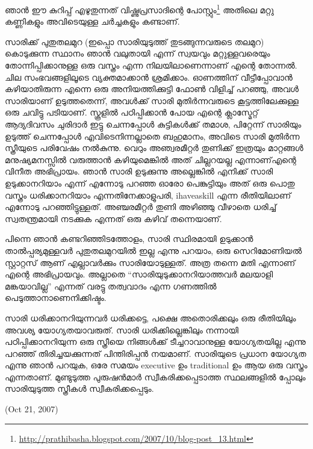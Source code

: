 \vskip 2pt


ഞാന്‍ ഈ കുറിപ്പ് എഴുതുന്നത് വിഷ്ണുപ്രസാദിന്റെ പോസ്റ്റും\footnote{\url{http://prathibasha.blogspot.com/2007/10/blog-post_13.html}} 
അതിലെ മറ്റു കണ്ണികളും അവിടെയുള്ള ചര്‍ച്ചകളും കണ്ടാണ്.

സാരിക്ക് പുതുതലമുറ (ഇപ്പൊ സാരിയുടുത്ത് തുടങ്ങുന്നവരുടെ തലമുറ) കൊടുക്കുന്ന സ്ഥാനം ഞാന്‍ വലുതായി 
എന്ന് സ്വയവും മറ്റുള്ളവരെയും തോന്നിപ്പിക്കാനുള്ള ഒരു വസ്ത്രം എന്ന നിലയിലാണെന്നാണ് എന്റെ തോന്നല്‍. 
ചില സംഭവങ്ങളിലൂടെ വ്യക്തമാക്കാന്‍ ശ്രമിക്കാം. ഓണത്തിന് വീട്ടീപ്പോവാന്‍ കഴിയാതിരുന്ന എന്നെ ഒരു 
അനിയത്തിക്കുട്ടി ഫോണ്‍ വിളിച്ച് പറഞ്ഞു, അവള്‍ സാരിയാണ് ഉടുത്തതെന്ന്, അവള്‍ക്ക് സാരി മുതിര്‍ന്നവരുടെ
കൂട്ടത്തിലേക്കുള്ള ഒരു ചവിട്ടു പടിയാണ്. സ്കൂളില്‍ പഠിപ്പിക്കാന്‍ പോയ എന്റെ ക്ലാസ്മേറ്റ് ആദ്യദിവസം ചുരിദാര്‍
ഇട്ടു ചെന്നപ്പോള്‍ കുട്ടികള്‍ക്ക് തമാശ, പിറ്റേന്ന് സാരിയും ഉടുത്ത് ചെന്നപ്പോള്‍ എവിടെനിന്നല്ലാതെ ബഹുമാനം, 
അവിടെ സാരി മുതിര്‍ന്ന സ്ത്രീയുടെ പരിവേഷം നല്‍കുന്നു. വെറും അഞ്വരമീറ്റര്‍ തുണിക്ക് ഇത്രയും മാറ്റങ്ങള്‍ 
മനുഷ്യമനസ്സില്‍ വരുത്താന്‍ കഴിയുമെങ്കില്‍ അത് ചില്ലറയല്ല എന്നാണ്എന്റെ വിനീത അഭിപ്രായം. ഞാന്‍ സാരി 
ഉടുക്കുന്നു അല്ലെങ്കില്‍ എനിക്ക് സാരി ഉടുക്കാനറിയാം എന്ന് എന്നോടു പറഞ്ഞ ഓരോ പെങ്കുട്ടിയും അത് ഒരു 
പൊതു വസ്ത്രം ധരിക്കാനറിയാം എന്നതിനേക്കാളുപരി, ihaveaskill എന്ന രീതിയിലാണ് എന്നോടു പറഞ്ഞിട്ടുള്ളത്. 
അഞ്ചരമീറ്റര്‍ തുണി അഴിഞ്ഞു വീഴാതെ ധരിച്ച് സ്വതന്ത്രമായി നടക്കുക എന്നത് ഒരു കഴിവ് തന്നെയാണ്.

പിന്നെ ഞാന്‍ കണ്ടറിഞ്ഞിടത്തോളം, സാരി സ്ഥിരമായി ഉടുക്കാന്‍ താല്‍പ്പര്യമുള്ളവര്‍ പുതുതലമുറയില്‍ ഇല്ല എന്നു പറയാം, 
ഒരു സെറിമോണിയല്‍ സ്റ്റാറ്റസ് ആണ് എല്ലാവര്‍ക്കും സാരിയോടുള്ളത്. അത്ര തന്നെ മതി എന്നാണ് എന്റെ അഭിപ്രായവും. 
അല്ലാതെ ``സാരിയുടുക്കാനറിയാത്തവര്‍ മലയാളി മങ്കയാവില്ല'' എന്നത് വരട്ടു തത്വവാദം എന്ന ഗണത്തില്‍ 
പെടുത്താനാണെനിക്കിഷ്ടം.

സാരി ധരിക്കാനറിയുന്നവര്‍ ധരിക്കട്ടെ, പക്ഷെ അതൊരിക്കലും ഒരു രീതിയിലും അവശ്യ യോഗ്യതയാവരുത്.
സാരി ധരിക്കില്ലെങ്കിലും നന്നായി പഠിപ്പിക്കാനറിയുന്ന ഒരു സ്ത്രീയെ നിങ്ങള്‍ക്ക് ടീച്ചറാവാനുള്ള യോഗ്യതയില്ല 
എന്നു പറഞ്ഞ് തിരിച്ചയക്കുന്നത് പിന്തിരിപ്പന്‍ നയമാണ്. സാരിയുടെ പ്രധാന യോഗ്യത എന്നു ഞാന്‍ പറയുക,
ഒരേ സമയം executive ഉം traditional ഉം ആയ ഒരു വസ്ത്രം എന്നതാണ്. മുണ്ടുടുത്ത പുരുഷന്‍മാര്‍ സ്വീകരിക്കപ്പെടാത്ത
സ്ഥലങ്ങളില്‍ പ്പോലും സാരിയുടുത്ത സ്ത്രീകള്‍ സ്വീകരിക്കപ്പെടും.

(Oct 21, 2007)
\newpage
